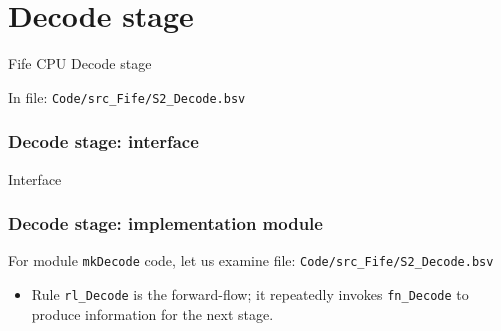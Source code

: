 
\section{Decode stage}

\begin{frame}[fragile]

\begin{center}
  {\LARGE Fife CPU Decode stage}

  \vspace{10ex}

  In file: \verb|Code/src_Fife/S2_Decode.bsv|
\end{center}

\end{frame}


\begin{frame}[fragile]
\frametitle{Decode stage: interface}

\footnotesize

\begin{minipage}{0.725\textwidth}
\end{minipage}
\hmm
Interface

\end{frame}


\begin{frame}[fragile]
\frametitle{Decode stage: implementation module}

\footnotesize

For module {\tt mkDecode} code, let us examine file: \verb|Code/src_Fife/S2_Decode.bsv|

\begin{itemize}

\vspace{4ex}

 \item Rule \verb|rl_Decode| is the forward-flow;
       it repeatedly invokes \verb|fn_Decode| to produce
       information for the next stage.

\end{itemize}

\end{frame}



